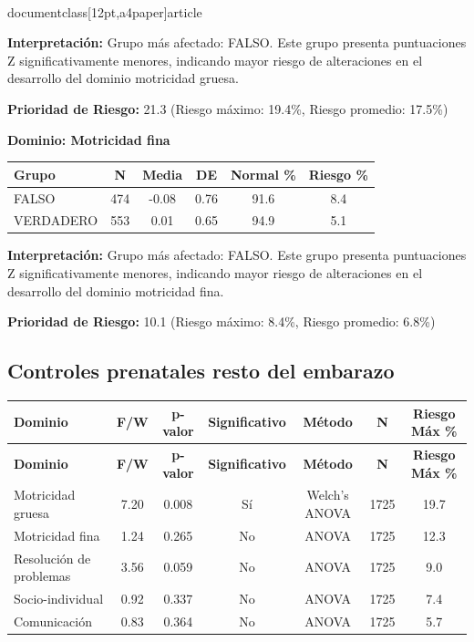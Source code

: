 \\documentclass[12pt,a4paper]{article}
\begin{document}
\textbf{Interpretación:} Grupo más afectado: FALSO. Este grupo presenta puntuaciones Z significativamente menores, indicando mayor riesgo de alteraciones en el desarrollo del dominio motricidad gruesa.

\textbf{Prioridad de Riesgo:} 21.3 (Riesgo máximo: 19.4\%, Riesgo promedio: 17.5\%)


\vspace{0.5cm}


\textbf{Dominio: Motricidad fina}


\begin{center}
\begin{tabular}{|l|c|c|c|c|c|}
\hline
\textbf{Grupo} & \textbf{N} & \textbf{Media} & \textbf{DE} & \textbf{Normal \%} & \textbf{Riesgo \%} \\
\hline
FALSO & 474 & -0.08 & 0.76 & 91.6 & 8.4 \\
VERDADERO & 553 & 0.01 & 0.65 & 94.9 & 5.1 \\

\hline
\end{tabular}
\end{center}


\textbf{Interpretación:} Grupo más afectado: FALSO. Este grupo presenta puntuaciones Z significativamente menores, indicando mayor riesgo de alteraciones en el desarrollo del dominio motricidad fina.

\textbf{Prioridad de Riesgo:} 10.1 (Riesgo máximo: 8.4\%, Riesgo promedio: 6.8\%)


\vspace{0.5cm}


\subsection{Controles prenatales resto del embarazo}


\begin{longtable}{|l|c|c|c|c|c|c|}
\hline
\textbf{Dominio} & \textbf{F/W} & \textbf{p-valor} & \textbf{Significativo} & \textbf{Método} & \textbf{N} & \textbf{Riesgo Máx \%} \\
\hline
\endfirsthead

\hline
\textbf{Dominio} & \textbf{F/W} & \textbf{p-valor} & \textbf{Significativo} & \textbf{Método} & \textbf{N} & \textbf{Riesgo Máx \%} \\
\hline
\endhead

\hline
\endfoot

\hline
\endlastfoot

Motricidad gruesa & 7.20 & 0.008 & Sí & Welch's ANOVA & 1725 & 19.7 \\
Motricidad fina & 1.24 & 0.265 & No & ANOVA & 1725 & 12.3 \\
Resolución de problemas & 3.56 & 0.059 & No & ANOVA & 1725 & 9.0 \\
Socio-individual & 0.92 & 0.337 & No & ANOVA & 1725 & 7.4 \\
Comunicación & 0.83 & 0.364 & No & ANOVA & 1725 & 5.7 \\

\end{longtable}
\end{document}
